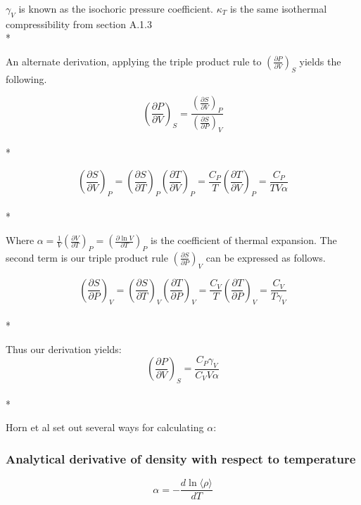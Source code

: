 \documentclass[aps,pre,twocolumn,nofootinbib,superscriptaddress,linenumbers,10pt, draft,tightenlines]{revtex4-1}
\begin{document}
 $\gamma_V$ is known as the isochoric pressure coefficient. $\kappa_T$ is the same isothermal compressibility from section A.1.3\\*

An alternate derivation, applying the triple product rule to $\left(\frac{\partial P}{\partial V}\right)_{S}$ yields the following.

\begin{equation}\left(\frac{\partial P}{\partial V}\right)_{S} = \frac{\left(\frac{\partial S}{\partial V}\right)_{P}}{\left(\frac{\partial S}{\partial P}\right)_{V}}\end{equation}\\*

\begin{equation}\left(\frac{\partial S}{\partial V}\right)_{P} = \left(\frac{\partial S}{\partial T}\right)_{P} \left(\frac{\partial T}{\partial V}\right)_{P} = \frac{C_P}{T} \left(\frac{\partial T}{\partial V}\right)_{P} = \frac{C_P}{T V \alpha}\end{equation}\\*

Where $\alpha = \frac{1}{V} \left(\frac{\partial V}{\partial T}\right)_{P} = \left(\frac{\partial \ln V}{\partial T}\right)_{P}$ is the coefficient of thermal expansion. The second term is our triple product rule $\left(\frac{\partial S}{\partial P}\right)_{V}$ can be expressed as follows.

\begin{equation}\left(\frac{\partial S}{\partial P}\right)_{V} = \left(\frac{\partial S}{\partial T}\right)_{V} \left(\frac{\partial T}{\partial P}\right)_{V} = \frac{C_V}{T} \left(\frac{\partial T}{\partial P}\right)_{V} = \frac{C_V}{T \gamma_V}\end{equation}\\* 

Thus our derivation yields:
\begin{equation}\left(\frac{\partial P}{\partial V}\right)_{S} = \frac{C_P \gamma_V}{C_V V \alpha}\end{equation}\\*

Horn et al set out several ways for calculating $\alpha$\cite{horn}:

\subsubsection{Analytical derivative of density with respect to temperature}
\begin{equation}\alpha = -\frac{d\ln\langle \rho \rangle}{dT}\end{equation}
\end{document}
